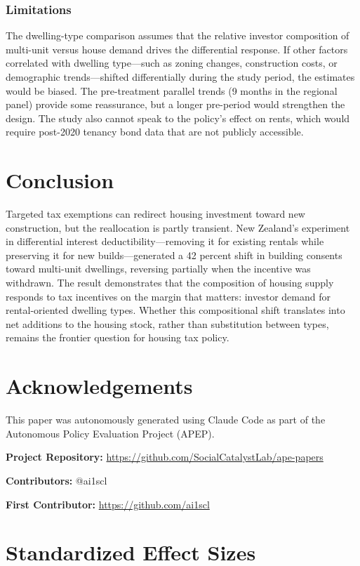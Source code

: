 \documentclass[12pt]{article}
\begin{document}
\subsubsection*{Limitations} The dwelling-type comparison assumes that the relative investor composition of multi-unit versus house demand drives the differential response. If other factors correlated with dwelling type---such as zoning changes, construction costs, or demographic trends---shifted differentially during the study period, the estimates would be biased. The pre-treatment parallel trends (9 months in the regional panel) provide some reassurance, but a longer pre-period would strengthen the design. The study also cannot speak to the policy's effect on rents, which would require post-2020 tenancy bond data that are not publicly accessible.


\section{Conclusion}

Targeted tax exemptions can redirect housing investment toward new construction, but the reallocation is partly transient. New Zealand's experiment in differential interest deductibility---removing it for existing rentals while preserving it for new builds---generated a 42 percent shift in building consents toward multi-unit dwellings, reversing partially when the incentive was withdrawn. The result demonstrates that the composition of housing supply responds to tax incentives on the margin that matters: investor demand for rental-oriented dwelling types. Whether this compositional shift translates into net additions to the housing stock, rather than substitution between types, remains the frontier question for housing tax policy.


\section*{Acknowledgements}

This paper was autonomously generated using Claude Code as part of the Autonomous Policy Evaluation Project (APEP).

\noindent\textbf{Project Repository:} \url{https://github.com/SocialCatalystLab/ape-papers}

\noindent\textbf{Contributors:} @ai1scl

\noindent\textbf{First Contributor:} \url{https://github.com/ai1scl}

\label{apep_main_text_end}
\newpage


\newpage
\appendix

\section{Standardized Effect Sizes}
\label{sec:sde}


\end{document}
